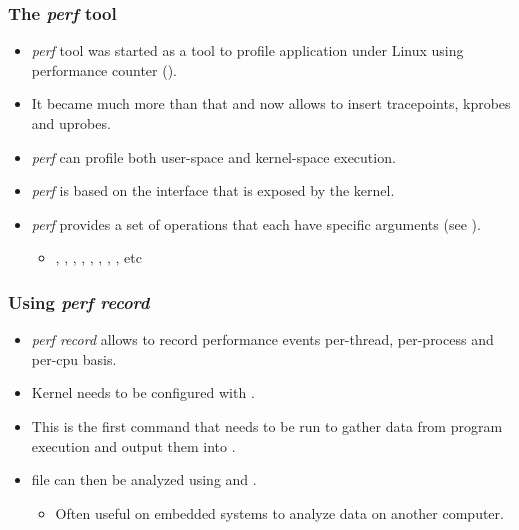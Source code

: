 \begin{frame}[fragile]
  \frametitle{The {\em perf} tool}
  \begin{itemize}
    \item {\em perf} tool was started as a tool to profile application under
          Linux using performance counter ().
    \item It became much more than that and now allows to insert tracepoints,
          kprobes and uprobes.
    \item {\em perf} can profile both user-space and kernel-space execution.
    \item {\em perf} is based on the  interface that is
          exposed by the kernel.
    \item {\em perf} provides a set of operations that each have specific
          arguments (see ).
    \begin{itemize}
      \item {}, , , , , , , , etc
    \end{itemize}
  \end{itemize}
\end{frame}

\begin{frame}[fragile]
  \frametitle{Using {\em perf record}}
  \begin{itemize}
    \item {\em perf record} allows to record performance events per-thread,
          per-process and per-cpu basis.
    \item Kernel needs to be configured with .
    \item This is the first command that needs to be run to gather data from
          program execution and output them into .
    \item {} file can then be analyzed using 
          and .
    \begin{itemize}
      \item Often useful on embedded systems to analyze data on another computer.
    \end{itemize}
  \end{itemize}
\end{frame}

